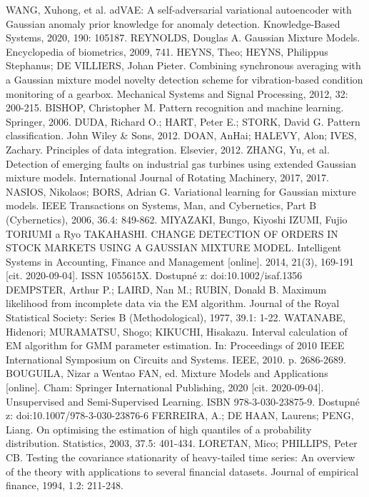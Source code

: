 \documentclass[11pt,twoside,openright]{report}
\begin{document}
\begin{thebibliography}{L}
WANG, Xuhong, et al. adVAE: A self-adversarial variational autoencoder with Gaussian anomaly prior knowledge for anomaly detection. Knowledge-Based Systems, 2020, 190: 105187.
REYNOLDS, Douglas A. Gaussian Mixture Models. Encyclopedia of biometrics, 2009, 741.
HEYNS, Theo; HEYNS, Philippus Stephanus; DE VILLIERS, Johan Pieter. Combining synchronous averaging with a Gaussian mixture model novelty detection scheme for vibration-based condition monitoring of a gearbox. Mechanical Systems and Signal Processing, 2012, 32: 200-215.
BISHOP, Christopher M. Pattern recognition and machine learning. Springer, 2006.
DUDA, Richard O.; HART, Peter E.; STORK, David G. Pattern classification. John Wiley \& Sons, 2012.
DOAN, AnHai; HALEVY, Alon; IVES, Zachary. Principles of data integration. Elsevier, 2012.
ZHANG, Yu, et al. Detection of emerging faults on industrial gas turbines using extended Gaussian mixture models. International Journal of Rotating Machinery, 2017, 2017.
NASIOS, Nikolaos; BORS, Adrian G. Variational learning for Gaussian mixture models. IEEE Transactions on Systems, Man, and Cybernetics, Part B (Cybernetics), 2006, 36.4: 849-862.
MIYAZAKI, Bungo, Kiyoshi IZUMI, Fujio TORIUMI a Ryo TAKAHASHI. CHANGE DETECTION OF ORDERS IN STOCK MARKETS USING A GAUSSIAN MIXTURE MODEL. Intelligent Systems in Accounting, Finance and Management [online]. 2014, 21(3), 169-191 [cit. 2020-09-04]. ISSN 1055615X. Dostupné z: doi:10.1002/isaf.1356
DEMPSTER, Arthur P.; LAIRD, Nan M.; RUBIN, Donald B. Maximum likelihood from incomplete data via the EM algorithm. Journal of the Royal Statistical Society: Series B (Methodological), 1977, 39.1: 1-22.
WATANABE, Hidenori; MURAMATSU, Shogo; KIKUCHI, Hisakazu. Interval calculation of EM algorithm for GMM parameter estimation. In: Proceedings of 2010 IEEE International Symposium on Circuits and Systems. IEEE, 2010. p. 2686-2689.
BOUGUILA, Nizar a Wentao FAN, ed. Mixture Models and Applications [online]. Cham: Springer International Publishing, 2020 [cit. 2020-09-04]. Unsupervised and Semi-Supervised Learning. ISBN 978-3-030-23875-9. Dostupné z: doi:10.1007/978-3-030-23876-6
FERREIRA, A.; DE HAAN, Laurens; PENG, Liang. On optimising the estimation of high quantiles of a probability distribution. Statistics, 2003, 37.5: 401-434.
LORETAN, Mico; PHILLIPS, Peter CB. Testing the covariance stationarity of heavy-tailed time series: An overview of the theory with applications to several financial datasets. Journal of empirical finance, 1994, 1.2: 211-248.

\end{thebibliography}
\end{document}
